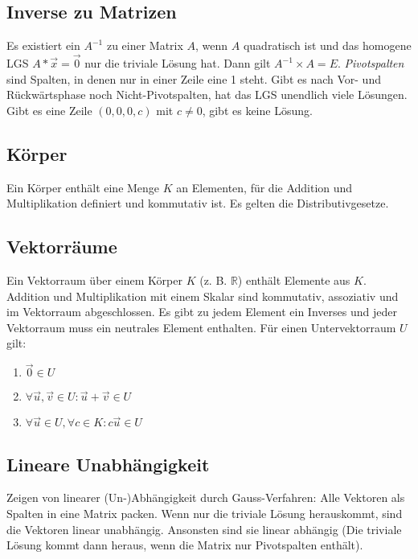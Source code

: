 \documentclass[12pt,landscape]{article}
\begin{document}
\begin{multicols}{3}
\subsection{Inverse zu Matrizen}
Es existiert ein $A^{-1}$ zu einer Matrix $A$, wenn $A$ quadratisch ist und das homogene LGS $A * \vec{x} = \vec{0}$ nur die triviale Lösung hat. Dann gilt $A^{-1} \times A = E$.
\textit{Pivotspalten} sind Spalten, in denen nur in einer Zeile eine 1 steht. Gibt es nach Vor- und Rückwärtsphase noch Nicht-Pivotspalten, hat das LGS unendlich viele Lösungen. Gibt es eine Zeile $(0,0,0,c)$ mit $c \neq 0$, gibt es keine Lösung.
\subsection{Körper}
Ein Körper enthält eine Menge $K$ an Elementen, für die Addition und Multiplikation definiert und kommutativ ist. Es gelten die Distributivgesetze.
\subsection{Vektorräume}
Ein Vektorraum über einem Körper $K$ (z. B. $\mathbb{R}$) enthält Elemente aus $K$. Addition und Multiplikation mit einem Skalar sind kommutativ, assoziativ und im Vektorraum abgeschlossen. Es gibt zu jedem Element ein Inverses und jeder Vektorraum muss ein neutrales Element enthalten.
Für einen Untervektorraum $U$ gilt:\\
\begin{enumerate}
\item $\vec{0} \in U$
\item $\forall \vec{u}, \vec{v} \in U: \vec{u} + \vec{v} \in U$
\item $\forall \vec{u} \in U, \forall c \in K: c\vec{u} \in U$
\end{enumerate}
\subsection{Lineare Unabhängigkeit}
Zeigen von linearer (Un-)Abhängigkeit durch Gauss-Verfahren: Alle Vektoren als Spalten in eine Matrix packen. Wenn nur die triviale Lösung herauskommt, sind die Vektoren linear unabhängig. Ansonsten sind sie linear abhängig (Die triviale Lösung kommt dann heraus, wenn die Matrix nur Pivotspalten enthält).

\end{multicols}
\end{document}
